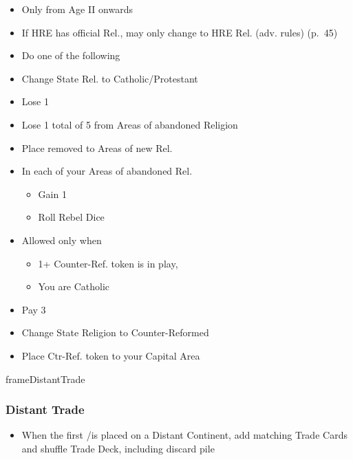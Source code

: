 \documentclass[10pt]{article}
\newlength{\fhDistantTrade} \setlength\fhDistantTrade{4\baselineskip}
\begin{document}
\begin{itemize}
	\item Only from Age II onwards
	\item If HRE has official Rel.,  may only change to HRE Rel. (adv. rules) (p.~45)
	\item Do one of the following
\end{itemize}
\begin{itemize}
	\item Change State Rel. to Catholic/Protestant
	\item Lose   1\stability
	\item Lose 1 \marriage {} total of 5 \influence from Areas of abandoned Religion
	\item Place removed \influence to Areas of new Rel.
	\item In each of your Areas of abandoned Rel.
	\begin{itemize}
		\item Gain 1 \unrest
		\item Roll Rebel Dice
	\end{itemize}
\end{itemize}
\begin{itemize}
	\item Allowed only when
	\begin{itemize}
		\item 1+ Counter-Ref. token is in play, 
		\item You are Catholic
	\end{itemize}
	\item Pay 3\adminpower
	\item Change State Religion to Counter-Reformed
	\item Place Ctr-Ref. token to your Capital Area
\end{itemize}

\begin{dynamiccontents*}{frameDistantTrade}\begin{eubox}{\fhDistantTrade}
	\subsubsection*{Distant Trade }
	\begin{itemize}
		\item When the first \claim/\dnpr is placed on a Distant Continent, add matching Trade Cards and shuffle Trade Deck, including discard pile
	\end{itemize}
\end{eubox}\end{dynamiccontents*}
\end{document}
